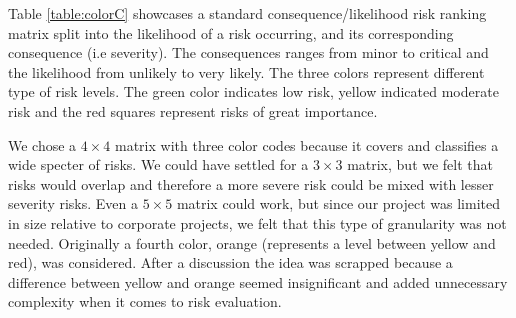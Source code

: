 \begin{table}[h]
\caption{Consequence and likelihood color coding risk matrix}
\label{table:colorC}
\end{table}

Table \ref{table:colorC} showcases a standard consequence/likelihood risk ranking matrix split into the likelihood of a risk occurring, and its corresponding consequence (i.e severity). The consequences ranges from minor to critical and the likelihood from unlikely to very likely. The three colors represent different type of risk levels. The green color indicates low risk, yellow indicated moderate risk and the red squares represent risks of great importance. 

We chose a $4\times4$ matrix with three color codes because it covers and classifies a wide specter of risks. We could have settled for a $3\times3$ matrix, but we felt that risks would overlap and therefore a more severe risk could be mixed with lesser severity risks. Even a $5\times5$ matrix could work, but since our project was limited in size relative to corporate projects, we felt that this type of granularity was not needed. Originally a fourth color, orange (represents a level between yellow and red), was considered. After a discussion the idea was scrapped because a difference between yellow and orange seemed insignificant and added unnecessary complexity when it comes to risk evaluation. 

